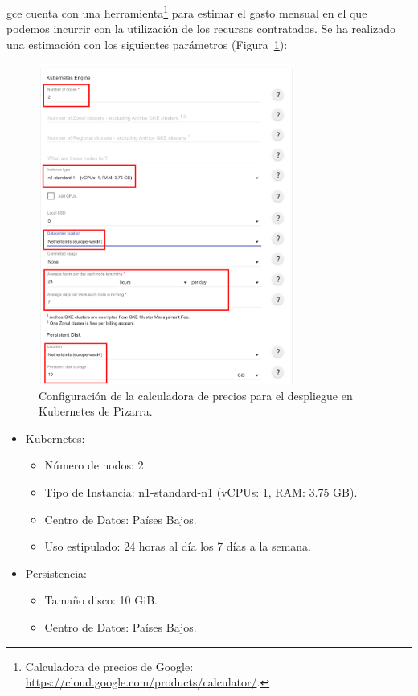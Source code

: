 \documentclass[11pt,spanish,listoffigures,listoftables]{tfgetsinf}
\begin{document}
\acrshort{gce} cuenta con una herramienta\footnote{Calculadora de precios de Google: \url{https://cloud.google.com/products/calculator/}.} para estimar el gasto mensual en el que podemos incurrir con la utilización de los recursos contratados. Se ha realizado una estimación con los siguientes parámetros (Figura~\ref{figura:gce-estimated-cost}):

\begin{figure}[!ht]
	\centering
	\includegraphics[width=0.75\textwidth]{img/google-cloud-engine-cluster-cost}
	\caption[Calculadora de precios en GCE]{Configuración de la calculadora de precios para el despliegue en Kubernetes de Pizarra.}
	\label{figura:gce-estimated-cost}
\end{figure}

\begin{itemize}
	\item  Kubernetes:
	\begin{itemize}
        \item Número de nodos: 2.
        \item Tipo de Instancia: n1-standard-n1 (vCPUs: 1, RAM: 3.75 GB).
        \item Centro de Datos: Países Bajos.
	    \item Uso estipulado: 24 horas al día los 7 días a la semana.
	 \end{itemize}
    \item Persistencia:
	\begin{itemize}
        \item Tamaño disco: 10 GiB.
        \item Centro de Datos: Países Bajos.
    \end{itemize}
\end{itemize}
\end{document}
